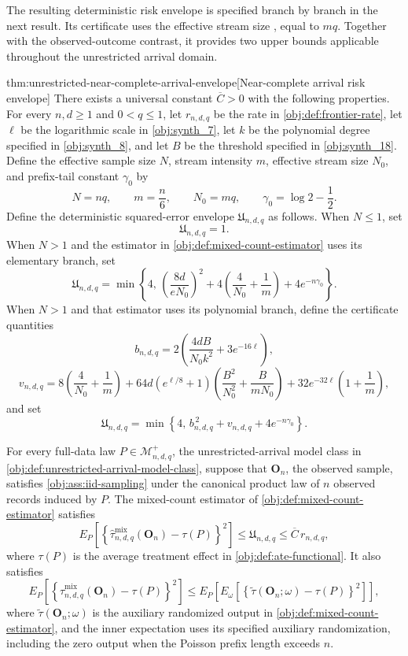 \documentclass[11pt]{article}
\begin{document}
The resulting deterministic risk envelope  is specified branch by branch in the next result. Its certificate uses the effective stream size , equal to \(mq\). Together with the observed-outcome contrast, it provides two upper bounds applicable throughout the unrestricted arrival domain.

\begin{theoremv}{thm:unrestricted-near-complete-arrival-envelope}[Near-complete arrival risk envelope]
There exists a universal constant \(\overline C>0\) with the following properties. For every \(n,d\ge1\) and \(0<q\le1\), let \(r_{n,d,q}\) be the rate in \cref{obj:def:frontier-rate}, let \(\ell\) be the logarithmic scale in \cref{obj:synth_7}, let \(k\) be the polynomial degree specified in \cref{obj:synth_8}, and let \(B\) be the threshold specified in \cref{obj:synth_18}. Define the effective sample size \(N\), stream intensity \(m\), effective stream size \(N_0\), and prefix-tail constant \(\gamma_0\) by
\[
N=nq,\qquad m=\frac n6,\qquad N_0=mq,\qquad
\gamma_0=\log 2-\frac12.
\]
Define the deterministic squared-error envelope \(\mathfrak U_{n,d,q}\) as follows. When \(N\le1\), set
\[
\mathfrak U_{n,d,q}=1.
\]
When \(N>1\) and the estimator in \cref{obj:def:mixed-count-estimator} uses its elementary branch, set
\[
\mathfrak U_{n,d,q}
=
\min\left\{
4,\,
\left(\frac{8d}{eN_0}\right)^2
+4\left(\frac4{N_0}+\frac1m\right)
+4e^{-n\gamma_0}
\right\}.
\]
When \(N>1\) and that estimator uses its polynomial branch, define the certificate quantities
\[
b_{n,d,q}
=
2\left(\frac{4dB}{N_0k^2}+3e^{-16\ell}\right),
\]
\[
v_{n,d,q}
=
8\left(\frac4{N_0}+\frac1m\right)
+64d\left(e^{\ell/8}+1\right)
\left(\frac{B^2}{N_0^2}+\frac{B}{mN_0}\right)
+32e^{-32\ell}\left(1+\frac1m\right),
\]
and set
\[
\mathfrak U_{n,d,q}
=
\min\left\{
4,\,
b_{n,d,q}^{\,2}+v_{n,d,q}+4e^{-n\gamma_0}
\right\}.
\]

For every full-data law \(P\in\mathcal M^{+}_{n,d,q}\), the unrestricted-arrival model class in \cref{obj:def:unrestricted-arrival-model-class}, suppose that \(\mathbf O_n\), the observed sample, satisfies \cref{obj:ass:iid-sampling} under the canonical product law of \(n\) observed records induced by \(P\). The mixed-count estimator of \cref{obj:def:mixed-count-estimator} satisfies
\[
E_P\!\left[
\left\{
\widehat\tau^{\mathrm{mix}}_{n,d,q}(\mathbf O_n)-\tau(P)
\right\}^{2}
\right]
\le \mathfrak U_{n,d,q}
\le \overline C\,r_{n,d,q},
\]
where \(\tau(P)\) is the average treatment effect in \cref{obj:def:ate-functional}. It also satisfies
\[
E_P\!\left[
\left\{
\widehat\tau^{\mathrm{mix}}_{n,d,q}(\mathbf O_n)-\tau(P)
\right\}^{2}
\right]
\le
E_P\!\left[
E_\omega\!\left[
\left\{
\widetilde\tau(\mathbf O_n;\omega)-\tau(P)
\right\}^{2}
\right]
\right],
\]
where \(\widetilde\tau(\mathbf O_n;\omega)\) is the auxiliary randomized output in \cref{obj:def:mixed-count-estimator}, and the inner expectation uses its specified auxiliary randomization, including the zero output when the Poisson prefix length exceeds \(n\).


\end{theoremv}
\end{document}
